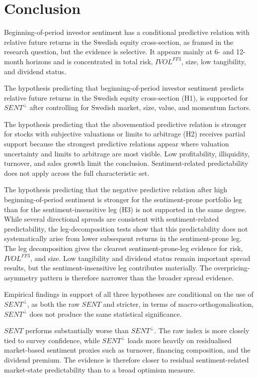\documentclass[11pt]{article}
\newcommand{\var}[1]{\ensuremath{#1}}
\begin{document}
\section{Conclusion}
Beginning-of-period investor sentiment has a conditional predictive relation with relative future returns in the Swedish equity cross-section, as framed in the research question, but the evidence is selective. It appears mainly at 6- and 12-month horizons and is concentrated in total risk, \var{IVOL^{FF3}}, size, low tangibility, and dividend status.

The hypothesis predicting that beginning-of-period investor sentiment predicts relative future returns in the Swedish equity cross-section (H1), is supported for \var{SENT^{\perp}} after controlling for Swedish market, size, value, and momentum factors.

The hypothesis predicting that the abovementiod predictive relation is stronger for stocks with subjective valuations or limits to arbitrage (H2) receives partial support because the strongest predictive relations appear where valuation uncertainty and limits to arbitrage are most visible. Low profitability, illiquidity, turnover, and sales growth limit the conclusion. Sentiment-related predictability does not apply across the full characteristic set.

The hypothesis predicting that the negative predictive relation after high beginning-of-period sentiment is stronger for the sentiment-prone portfolio leg than for the sentiment-insensitive leg (H3) is not supported in the same degree. While several directional spreads are consistent with sentiment-related predictability, the leg-decomposition tests show that this predictability does not systematically arise from lower subsequent returns in the sentiment-prone leg. The leg decomposition gives the clearest sentiment-prone-leg evidence for risk, \var{IVOL^{FF3}}, and size. Low tangibility and dividend status remain important spread results, but the sentiment-insensitive leg contributes materially. The overpricing-asymmetry pattern is therefore narrower than the broader spread evidence.

Empirical findings in support of all three hypotheses are conditional on the use of \var{SENT^{\perp}}, as both the raw \var{SENT} and stricter, in terms of macro-orthogonalisation, \var{SENT^{\perp}} does not produce the same statistical significance.

\var{SENT} performs substantially worse than \var{SENT^{\perp}}. The raw index is more closely tied to survey confidence, while \var{SENT^{\perp}} loads more heavily on residualised market-based sentiment proxies such as turnover, financing composition, and the dividend premium. The evidence is therefore closer to residual sentiment-related market-state predictability than to a broad optimism measure.
\end{document}
